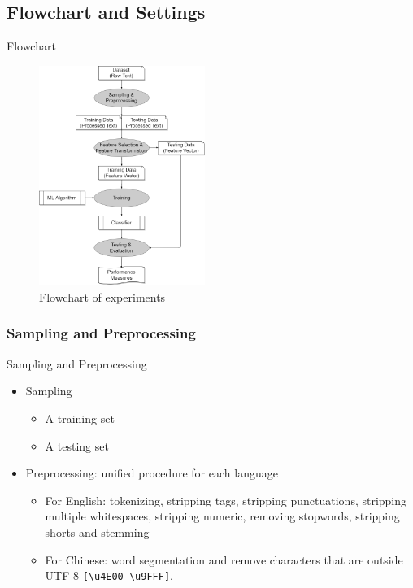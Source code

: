 \documentclass[mathserif]{beamer}
\begin{document}
\subsection{Flowchart and Settings}
\begin{frame}{Flowchart}
	\begin{figure}
	\centering
	\caption{Flowchart of experiments}
	\includegraphics[width=0.48\textwidth]{./figure/flowchart.png}
	\end{figure}
\end{frame}

\subsubsection{Sampling and Preprocessing}
\begin{frame}{Sampling and Preprocessing}
	\begin{itemize}
	\item Sampling
		\begin{itemize}
			\item A training set
			\item A testing set
		\end{itemize}
	\item Preprocessing: unified procedure for each language
		\begin{itemize}
			\item For English: tokenizing, stripping tags, stripping punctuations, stripping multiple whitespaces, stripping numeric, removing stopwords, stripping shorts and stemming
			\item For Chinese: word segmentation and remove characters that are outside UTF-8 \texttt{[\textbackslash u4E00-\textbackslash u9FFF]}.
		\end{itemize}
	\end{itemize}
\end{frame}
\end{document}
